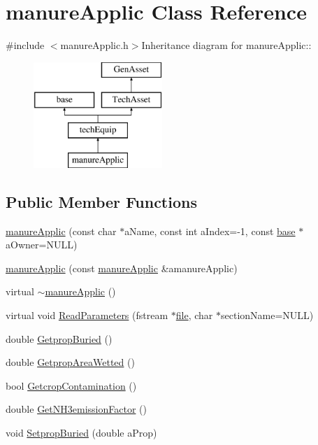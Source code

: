 \hypertarget{classmanure_applic}{
\section{manureApplic Class Reference}
\label{classmanure_applic}
}


{\ttfamily \#include $<$manureApplic.h$>$}Inheritance diagram for manureApplic::\begin{figure}[H]
\begin{center}
\leavevmode
\includegraphics[height=4cm]{classmanure_applic}
\end{center}
\end{figure}
\subsection*{Public Member Functions}
\begin{DoxyCompactItemize}
\item 
\hyperlink{classmanure_applic_a29f3f549713d4c3b7a97927308f8c34c}{manureApplic} (const char $\ast$aName, const int aIndex=-\/1, const \hyperlink{classbase}{base} $\ast$aOwner=NULL)
\item 
\hyperlink{classmanure_applic_a79a516efa331299d3fa91912d157f3ea}{manureApplic} (const \hyperlink{classmanure_applic}{manureApplic} \&amanureApplic)
\item 
virtual \hyperlink{classmanure_applic_a496499e94e520c12aa875b4855c02345}{$\sim$manureApplic} ()
\item 
virtual void \hyperlink{classmanure_applic_abd655046e002e2da34a796b45f0597e2}{ReadParameters} (fstream $\ast$\hyperlink{classbase_a3af52ee9891719d09b8b19b42450b6f6}{file}, char $\ast$sectionName=NULL)
\item 
double \hyperlink{classmanure_applic_a389c300ba0029e1ed26a7b4c60e7cc3c}{GetpropBuried} ()
\item 
double \hyperlink{classmanure_applic_a2828314e17f645f81eff461bd4fa0b9f}{GetpropAreaWetted} ()
\item 
bool \hyperlink{classmanure_applic_a3581fc50d2f70fd92023235c2788b435}{GetcropContamination} ()
\item 
double \hyperlink{classmanure_applic_ac1ac216735eb3955d4124e48d8d1c78f}{GetNH3emissionFactor} ()
\item 
void \hyperlink{classmanure_applic_a711b90ca171d16b0153d11395f6de6ed}{SetpropBuried} (double aProp)
\end{DoxyCompactItemize}
